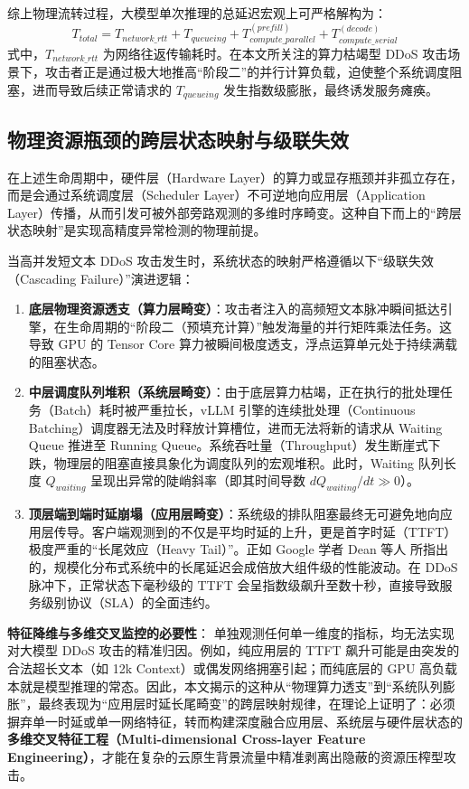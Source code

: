 \documentclass[master, vlined]{DissertUESTC}
\begin{document}
	综上物理流转过程，大模型单次推理的总延迟宏观上可严格解构为：
	\begin{equation}
		T_{total} = T_{network\_rtt} + T_{queueing} + T_{compute\_parallel}^{(prefill)} + T_{compute\_serial}^{(decode)}
	\end{equation}
	式中，$T_{network\_rtt}$ 为网络往返传输耗时。在本文所关注的算力枯竭型 DDoS 攻击场景下，攻击者正是通过极大地推高“阶段二”的并行计算负载，迫使整个系统调度阻塞，进而导致后续正常请求的 $T_{queueing}$ 发生指数级膨胀，最终诱发服务瘫痪。

\subsection{物理资源瓶颈的跨层状态映射与级联失效}
	在上述生命周期中，硬件层（Hardware Layer）的算力或显存瓶颈并非孤立存在，而是会通过系统调度层（Scheduler Layer）不可逆地向应用层（Application Layer）传播，从而引发可被外部旁路观测的多维时序畸变。这种自下而上的“跨层状态映射”是实现高精度异常检测的物理前提。

	当高并发短文本 DDoS 攻击发生时，系统状态的映射严格遵循以下“级联失效（Cascading Failure）”演进逻辑：
	
	\begin{enumerate}
		\item \textbf{底层物理资源透支（算力层畸变）}：攻击者注入的高频短文本脉冲瞬间抵达引擎，在生命周期的“阶段二（预填充计算）”触发海量的并行矩阵乘法任务。这导致 GPU 的 Tensor Core 算力被瞬间极度透支，浮点运算单元处于持续满载的阻塞状态。
		\item \textbf{中层调度队列堆积（系统层畸变）}：由于底层算力枯竭，正在执行的批处理任务（Batch）耗时被严重拉长，vLLM 引擎的连续批处理（Continuous Batching）调度器无法及时释放计算槽位，进而无法将新的请求从 Waiting Queue 推进至 Running Queue。系统吞吐量（Throughput）发生断崖式下跌，物理层的阻塞直接具象化为调度队列的宏观堆积。此时，Waiting 队列长度 $Q_{waiting}$ 呈现出异常的陡峭斜率（即其时间导数 $dQ_{waiting}/dt \gg 0$）。
		\item \textbf{顶层端到端时延崩塌（应用层畸变）}：系统级的排队阻塞最终无可避免地向应用层传导。客户端观测到的不仅是平均时延的上升，更是首字时延（TTFT）极度严重的“长尾效应（Heavy Tail）”。正如 Google 学者 Dean 等人 \cite{规模化环境下的长尾延迟问题} 所指出的，规模化分布式系统中的长尾延迟会成倍放大组件级的性能波动。在 DDoS 脉冲下，正常状态下毫秒级的 TTFT 会呈指数级飙升至数十秒，直接导致服务级别协议（SLA）的全面违约。
	\end{enumerate}

	\textbf{特征降维与多维交叉监控的必要性}：
	单独观测任何单一维度的指标，均无法实现对大模型 DDoS 攻击的精准归因。例如，纯应用层的 TTFT 飙升可能是由突发的合法超长文本（如 12k Context）或偶发网络拥塞引起；而纯底层的 GPU 高负载本就是模型推理的常态。因此，本文揭示的这种从“物理算力透支”到“系统队列膨胀”，最终表现为“应用层时延长尾畸变”的跨层映射规律，在理论上证明了：必须摒弃单一时延或单一网络特征，转而构建深度融合应用层、系统层与硬件层状态的\textbf{多维交叉特征工程（Multi-dimensional Cross-layer Feature Engineering）}，才能在复杂的云原生背景流量中精准剥离出隐蔽的资源压榨型攻击。
\end{document}
